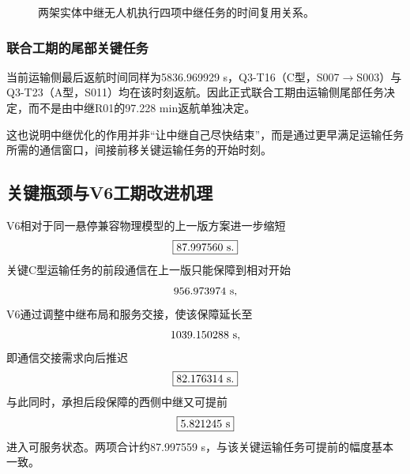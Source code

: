 \documentclass[UTF8,a4paper,12pt]{ctexart}
\begin{document}
\begin{figure}[H]
\centering
{}
\caption{两架实体中继无人机执行四项中继任务的时间复用关系。}
\label{fig:q3_relay_gantt_v6}
\end{figure}

\subsubsection{联合工期的尾部关键任务}

当前运输侧最后返航时间同样为5836.969929 s，Q3-T16（C型，S007$\to$S003）与Q3-T23（A型，S011）均在该时刻返航。因此正式联合工期由运输侧尾部任务决定，而不是由中继R01的97.228 min返航单独决定。

这也说明中继优化的作用并非“让中继自己尽快结束”，而是通过更早满足运输任务所需的通信窗口，间接前移关键运输任务的开始时刻。

\subsection{关键瓶颈与V6工期改进机理}

V6相对于同一悬停兼容物理模型的上一版方案进一步缩短
\[
\boxed{
87.997560\ {\rm s}.
}
\]
关键C型运输任务的前段通信在上一版只能保障到相对开始
\[
956.973974\ {\rm s},
\]
V6通过调整中继布局和服务交接，使该保障延长至
\[
1039.150288\ {\rm s},
\]
即通信交接需求向后推迟
\[
\boxed{
82.176314\ {\rm s}.
}
\]
与此同时，承担后段保障的西侧中继又可提前
\[
\boxed{
5.821245\ {\rm s}
}
\]
进入可服务状态。两项合计约87.997559 s，与该关键运输任务可提前的幅度基本一致。
\end{document}
